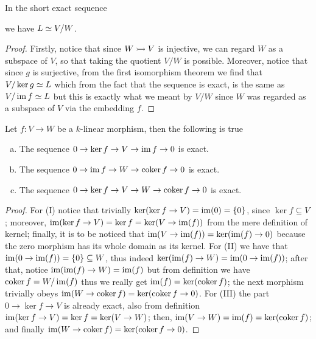 \begin{proposition}
  In the short exact sequence
  we have \(L \simeq V/W\).
\end{proposition}

\begin{proof}
  Firstly, notice that since \(W \rightarrowtail V\) is injective, we can
  regard \(W\) as a subspace of \(V\), so that taking the quotient \(V/W\) is
  possible. Moreover, notice that since \(g\) is surjective, from the first
  isomorphism theorem we find that \(V/\ker g \simeq L\) which from the fact that
  the sequence is exact, is the same as \(V/\operatorname{im} f \simeq L\) but this is exactly
  what we meant by \(V/W\) since \(W\) was regarded as a subspace of \(V\) via
  the embedding \(f\).
\end{proof}

\begin{proposition}
   Let \(f : V \to W\) be a \(k\)-linear morphism, then the following is true
   \begin{enumerate}[(a).]
     \item The sequence \(0 \to \ker f \to V \to \operatorname{im} f \to 0\) is exact.
     \item The sequence \(0 \to \operatorname{im} f \to W \to \operatorname{coker} f \to 0\) is exact.
     \item The sequence \(0 \to \ker f \to V \to W \to \operatorname{coker} f \to 0\) is
       exact.
   \end{enumerate}
\end{proposition}

\begin{proof}
  For (I) notice that trivially \(\ker(\ker f \to V) = \operatorname{im}(0) = \{0\}\), since
  \(\ker f \subseteq V\); moreover, \(\operatorname{im}(\ker f \to V) = \ker f = \ker(V \to
  \operatorname{im}(f))\) from the mere definition of kernel; finally, it is to be noticed
  that \(\operatorname{im}(V \to \operatorname{im}(f)) = \ker(\operatorname{im}(f) \to 0)\) because the zero morphism has
  its whole domain as its kernel.
  For (II) we have that \(\operatorname{im}(0 \to \operatorname{im}(f)) = \{0\} \subseteq W\), thus indeed
  \(\ker(\operatorname{im}(f) \to W) = \operatorname{im}(0 \to \operatorname{im}(f))\); after that, notice \(\operatorname{im}(\operatorname{im}(f)
  \to W) = \operatorname{im}(f)\) but from definition we have \(\operatorname{coker} f = W/\operatorname{im}(f)\) thus we
  really get \(\operatorname{im}(f) = \ker(\operatorname{coker} f)\); the next morphism trivially obeys
  \(\operatorname{im}(W \to \operatorname{coker} f) = \ker(\operatorname{coker} f \to 0)\).
  For (III) the part \(0 \to \ker f \to V\) is already exact, also from
  definition \(\operatorname{im}(\ker f \to V) = \ker f = \ker(V \to W)\); then, \(\operatorname{im}(V \to
  W) = \operatorname{im}(f) = \ker(\operatorname{coker} f)\); and finally  \(\operatorname{im}(W \to \operatorname{coker} f) =
  \ker(\operatorname{coker} f \to 0)\).
\end{proof}

